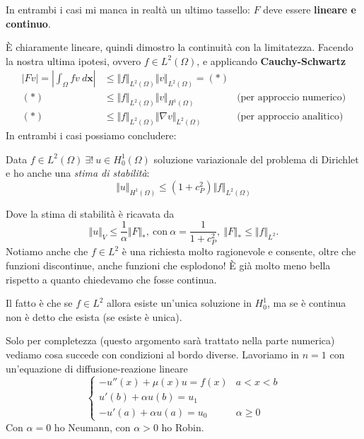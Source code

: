 \documentclass[10pt,a4paper,twoside,openright]{book}
\begin{document}
In entrambi i casi mi manca in realtà un ultimo tassello: $\displaystyle F$ deve essere \textbf{lineare e continuo}.

È chiaramente lineare, quindi dimostro la continuità con la limitatezza. Facendo la nostra ultima ipotesi, ovvero $\displaystyle f\in L^{2}( \Omega )$, e applicando \textbf{Cauchy-Schwartz}
\begin{align*}
	| Fv| =\left| \int _{\Omega } fv\ d\mathbf{x}\right| & \leqslant \Vert f\Vert _{L^{2}( \Omega )}\Vert v\Vert _{L^{2}( \Omega )} =( *)  &                                  \\
	( *)                                                 & \leqslant \Vert f\Vert _{L^{2}( \Omega )}\Vert v\Vert _{H^{1}( \Omega )}        & \text{(per approccio numerico)}  \\
	( *)                                                 & \leqslant \Vert f\Vert _{L^{2}( \Omega )}\Vert \nabla v\Vert _{L^{2}( \Omega )} & \text{(per approccio analitico)} 
\end{align*}
In entrambi i casi possiamo concludere:
\begin{theorem}
	Data $\displaystyle f\in L^{2}( \Omega ) \ \exists !\ u\in H_{0}^{1}( \Omega )$ soluzione variazionale del problema di Dirichlet e ho anche una \textit{stima di stabilità}:
	\begin{equation*}
		\Vert u\Vert _{H^{1}( \Omega )} \leqslant \left( 1+c_{P}^{2}\right)\Vert f\Vert _{L^{2}( \Omega )}
	\end{equation*}
\end{theorem}
Dove la stima di stabilità è ricavata da
\begin{equation*}
	\Vert u\Vert _{V} \leqslant \frac{1}{\alpha }\Vert F\Vert _{*} ,\ \text{con} \ \alpha =\frac{1}{1+c_{P}^{2}} ,\ \Vert F\Vert _{*} \leqslant \Vert f\Vert _{L^{2}} .
\end{equation*}
Notiamo anche che $\displaystyle f\in L^{2}$ è una richiesta molto ragionevole e consente, oltre che funzioni discontinue, anche funzioni che esplodono! È già molto meno bella rispetto a quanto chiedevamo che fosse continua.

Il fatto è che se $\displaystyle f\in L^{2}$ allora esiste un'unica soluzione in $\displaystyle H_{0}^{1}$, ma se è continua non è detto che esista (se esiste è unica).



Solo per completezza (questo argomento sarà trattato nella parte numerica) vediamo cosa succede con condizioni al bordo diverse. Lavoriamo in $\displaystyle n=1$ con un'equazione di diffusione-reazione lineare
\begin{equation*}
	\begin{cases}
		-u''( x) +\mu ( x) u=f( x)   & a< x< b            \\
		u'( b) +\alpha u( b) =u_{1}  &                    \\
		-u'( a) +\alpha u( a) =u_{0} & \alpha \geqslant 0 
	\end{cases}
\end{equation*}
Con $\displaystyle \alpha =0$ ho Neumann, con $\displaystyle \alpha  >0$ ho Robin.
\end{document}
